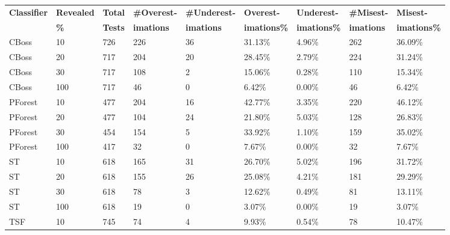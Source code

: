\begin{landscape}
  \begin{table}[hp!]
    \setlength\extrarowheight{2pt} %
    \begin{tabularx}{\hsize}{|X|X|X|X|X|X|X|X|X|}
    \hline
    \textbf{Classifier} & 
    \textbf{Revealed} & 
    \textbf{Total} & 
    \textbf{\#Overest-} & 
    \textbf{\#Underest-}  & 
    \textbf{Overest-} & 
    \textbf{Underest-} & 
    \textbf{\#Misest-} & 
    \textbf{Misest-} \\
    &
    \textbf{\%} & 
    \textbf{Tests} & 
    \textbf{imations} & 
    \textbf{imations}  & 
    \textbf{imations\%} & 
    \textbf{imations\%} & 
    \textbf{imations}  & 
    \textbf{imations\%}\\
    \hline
    CBoss   & 10 & 726 & 226 & 36 & 31.13\% & 4.96\% & 262 & 36.09\% \\ \hline
    CBoss   & 20 & 717 & 204 & 20 & 28.45\% & 2.79\% & 224 & 31.24\% \\ \hline
    CBoss   & 30 & 717 & 108 & 2 & 15.06\% & 0.28\% & 110 & 15.34\% \\ \hline
    CBoss   & 100 & 717 & 46 & 0 & 6.42\% & 0.00\% & 46 & 6.42\% \\ \hline
    PForest & 10 & 477 & 204 & 16 & 42.77\% & 3.35\% & 220 & 46.12\% \\ \hline
    PForest & 20 & 477 & 104 & 24 & 21.80\% & 5.03\% & 128 & 26.83\% \\ \hline
    PForest & 30 & 454 & 154 & 5 & 33.92\% & 1.10\% & 159 & 35.02\% \\ \hline
    PForest & 100 & 417 & 32 & 0 & 7.67\% & 0.00\% & 32 & 7.67\% \\ \hline
    ST      & 10 & 618 & 165 & 31 & 26.70\% & 5.02\% & 196 & 31.72\% \\ \hline
    ST      & 20 & 618 & 155 & 26 & 25.08\% & 4.21\% & 181 & 29.29\% \\ \hline
    ST      & 30 & 618 & 78 & 3 & 12.62\% & 0.49\% & 81 & 13.11\% \\ \hline
    ST      & 100 & 618 & 19 & 0 & 3.07\% & 0.00\% & 19 & 3.07\% \\ \hline
    TSF     & 10 & 745 & 74 & 4 & 9.93\% & 0.54\% & 78 & 10.47\% \\ \hline

\end{tabularx}
\end{table}
\end{landscape}
